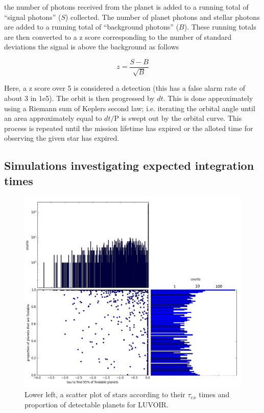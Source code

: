 \documentclass{article}
\begin{document}
the number of photons received from the planet is added to a running total of ``signal photons'' ($S$) collected. The number of planet photons and stellar photons are added to a running total of ``background photons'' ($B$). These running totals are then converted to a z score corresponding to the number of standard deviations the signal is above the background as follows 
	
	\begin{equation}
		z = \frac{S - B}{\sqrt{B}}
	\end{equation}
	
	Here, a z score over 5 is considered a detection (this has a false alarm rate of about 3 in 1e5). The orbit is then progressed by $dt$. This is done approximately using a Riemann sum of Keplers second law; i.e. iterating the orbital angle until an area approximately equal to $dt/\mbox{P}$ is swept out by the orbital curve. 
	This process is repeated until the mission lifetime has expired or the alloted time for observing the given star has expired.
	
	\subsection{Simulations investigating expected integration times}
	
	\begin{figure}
		\includegraphics[width = \linewidth]{findable_v_tau_ex_LUVOIR_composite.png}
		\caption{Lower left, a scatter plot of stars according to their $\tau_{ex}$ times and proportion of detectable planets for LUVOIR.}
		\label{fig:LUVOIR_tau_ex}
	\end{figure}
	
\end{document}
